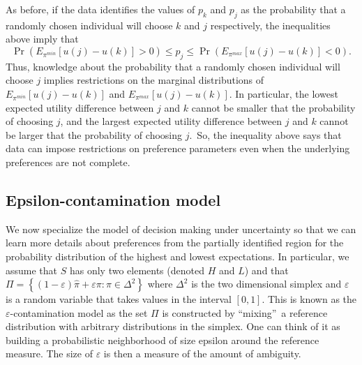 \documentclass[reqno]{article}
\begin{document}
As before, if the data identifies the values of $p_{k}$ and $p_{j}$ as the
probability that a randomly chosen individual will choose $k$ and $j$
respectively, the inequalities above imply that 
\begin{equation*}
\Pr \left( E_{\pi ^{min}}\left[ u\left( j\right) -u\left( k\right) \right]
>0\right) \leq p_{j}\leq \Pr \left( E_{\pi ^{max}}\left[ u\left( j\right)
-u\left( k\right) \right] <0\right) .
\end{equation*}%
Thus, knowledge about the probability that a randomly chosen individual will
choose $j$ implies restrictions on the marginal distributions of $E_{\pi
^{min}}\left[ u\left( j\right) -u\left( k\right) \right] $ and $E_{\pi
^{max}}\left[ u\left( j\right) -u\left( k\right) \right] $. In particular,
the lowest expected utility difference between $j$ and $k$ cannot be smaller
that the probability of choosing $j$, and the largest expected utility
difference between $j$ and $k$ cannot be larger that the probability of
choosing $j$.\ So, the inequality above says that data can impose
restrictions on preference parameters even when the underlying preferences
are not complete.

\subsection{Epsilon-contamination model}

We now specialize the model of decision making under uncertainty so that we
can learn more details about preferences from the partially identified
region for the probability distribution of the highest and lowest
expectations. In particular, we assume that $S$ has only two elements
(denoted $H$ and $L$) and that $\Pi =\left\{ (1-\varepsilon )\hat{\pi}%
+\varepsilon \pi :\pi \in \Delta ^{2}\right\} $ where $\Delta ^{2}$ is the
two dimensional simplex and $\varepsilon $ is a random variable that takes
values in the interval $\left[ 0,1\right] $. This is known as the $%
\varepsilon $-contamination model as the set $\Pi $ is constructed by
\textquotedblleft mixing\textquotedblright\ a reference distribution with
arbitrary distributions in the simplex. One can think of it as building a
probabilistic neighborhood of size epsilon around the reference measure. The
size of $\varepsilon $ is then a measure of the amount of ambiguity.
\end{document}

